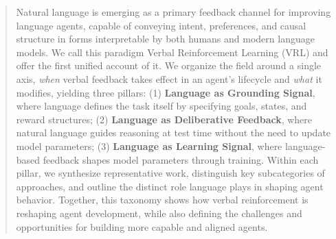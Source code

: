 \begin{abstract}
Natural language is emerging as a primary feedback channel for improving language agents, capable of conveying intent, preferences, and causal structure in forms interpretable by both humans and modern language models. We call this paradigm Verbal Reinforcement Learning (VRL) and offer the first unified account of it. We organize the field around a single axis, \textit{when} verbal feedback takes effect in an agent's lifecycle and \textit{what} it modifies, yielding three pillars: (1) \textbf{Language as Grounding Signal}, where language defines the task itself by specifying goals, states, and reward structures; (2) \textbf{Language as Deliberative Feedback}, where natural language guides reasoning at test time without the need to update model parameters; (3) \textbf{Language as Learning Signal}, where language-based feedback shapes model parameters through training. Within each pillar, we synthesize representative work, distinguish key subcategories of approaches, and outline the distinct role language plays in shaping agent behavior. Together, this taxonomy shows how verbal reinforcement is reshaping agent development, while also defining the challenges and opportunities for building more capable and aligned agents.
\end{abstract}

